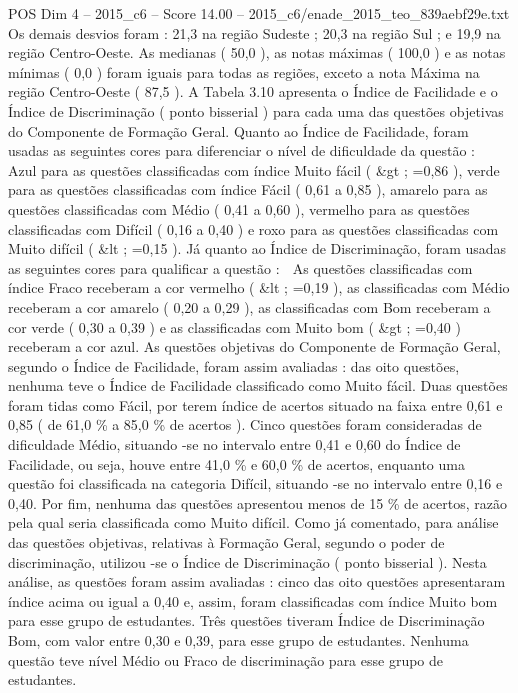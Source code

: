 \begin{textsample}{POS Dim 4 – 2015\_c6 – Score 14.00 – 2015\_c6/enade\_2015\_teo\_839aebf29e.txt}
Os demais desvios foram : 21,3 na região Sudeste ; 20,3 na região Sul ; e 19,9 na região Centro-Oeste.
As medianas ( 50,0 ), as notas máximas ( 100,0 ) e as notas mínimas ( 0,0 ) foram iguais para todas as regiões, exceto a nota Máxima na região Centro-Oeste ( 87,5 ).
A Tabela 3.10 apresenta o Índice de Facilidade e o Índice de Discriminação ( ponto bisserial ) para cada uma das questões objetivas do Componente de Formação Geral.
Quanto ao Índice de Facilidade, foram usadas as seguintes cores para diferenciar o nível de dificuldade da questão :  Azul para as questões classificadas com índice Muito fácil ( \&gt ; =0,86 ), verde para as questões classificadas com índice Fácil ( 0,61 a 0,85 ), amarelo para as questões classificadas com Médio ( 0,41 a 0,60 ), vermelho para as questões classificadas com Difícil ( 0,16 a 0,40 ) e roxo para as questões classificadas com Muito difícil ( \&lt ; =0,15 ).
Já quanto ao Índice de Discriminação, foram usadas as seguintes cores para qualificar a questão :  As questões classificadas com índice Fraco receberam a cor vermelho ( \&lt ; =0,19 ), as classificadas com Médio receberam a cor amarelo ( 0,20 a 0,29 ), as classificadas com Bom receberam a cor verde ( 0,30 a 0,39 ) e as classificadas com Muito bom ( \&gt ; =0,40 ) receberam a cor azul.
As questões objetivas do Componente de Formação Geral, segundo o Índice de Facilidade, foram assim avaliadas : das oito questões, nenhuma teve o Índice de Facilidade classificado como Muito fácil.
Duas questões foram tidas como Fácil, por terem índice de acertos situado na faixa entre 0,61 e 0,85 ( de 61,0 \% a 85,0 \% de acertos ).
Cinco questões foram consideradas de dificuldade Médio, situando -se no intervalo entre 0,41 e 0,60 do Índice de Facilidade, ou seja, houve entre 41,0 \% e 60,0 \% de acertos, enquanto uma questão foi classificada na categoria Difícil, situando -se no intervalo entre 0,16 e 0,40.
Por fim, nenhuma das questões apresentou menos de 15 \% de acertos, razão pela qual seria classificada como Muito difícil.
Como já comentado, para análise das questões objetivas, relativas à Formação Geral, segundo o poder de discriminação, utilizou -se o Índice de Discriminação ( ponto bisserial ).
Nesta análise, as questões foram assim avaliadas : cinco das oito questões apresentaram índice acima ou igual a 0,40 e, assim, foram classificadas com índice Muito bom para esse grupo de estudantes.
Três questões tiveram Índice de Discriminação Bom, com valor entre 0,30 e 0,39, para esse grupo de estudantes.
Nenhuma questão teve nível Médio ou Fraco de discriminação para esse grupo de estudantes.

\end{textsample}

